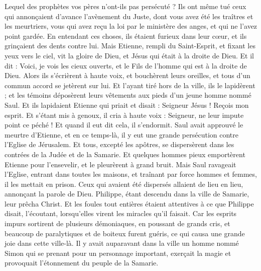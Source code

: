 \begin{multicols}{2}
Lequel des prophètes vos pères n'ont-ils pas persécuté ? Ils ont même tué ceux qui annonçaient d’avance l'avènement du Juste, dont vous avez été les traîtres et les meurtriers,
vous qui avez reçu la loi par le ministère des anges, et qui ne l'avez point gardée.
En entendant ces choses, ils étaient furieux dans leur cœur, et ils grinçaient des dents contre lui.
Mais Etienne, rempli du Saint-Esprit, et fixant les yeux vers le ciel, vit la gloire de Dieu, et Jésus qui était à la droite de Dieu.
Et il dit : Voici, je vois les cieux ouverts, et le Fils de l'homme qui est à la droite de Dieu.
Alors ils s'écrièrent à haute voix, et bouchèrent leurs oreilles, et tous d'un commun accord se jetèrent sur lui.
Et l'ayant tiré hors de la ville, ils le lapidèrent ; et les témoins déposèrent leurs vêtements aux pieds d'un jeune homme nommé Saul.
Et ils lapidaient Etienne qui priait et disait : Seigneur Jésus ! Reçois mon esprit.
Et s'étant mis à genoux, il cria à haute voix : Seigneur, ne leur impute point ce péché ! Et quand il eut dit cela, il s'endormit.
\VerseOne{}Saul avait approuvé le meurtre d'Etienne, et en ce temps-là, il y eut une grande persécution contre l'Eglise de Jérusalem. Et tous, excepté les apôtres, se dispersèrent dans les contrées de la Judée et de la Samarie.
Et quelques hommes pieux emportèrent Etienne pour l'ensevelir, et le pleurèrent à grand bruit.
Mais Saul ravageait l'Eglise, entrant dans toutes les maisons, et traînant par force hommes et femmes, il les mettait en prison.
Ceux qui avaient été dispersés allaient de lieu en lieu, annonçant la parole de Dieu.
Philippe, étant descendu dans la ville de Samarie, leur prêcha Christ.
Et les foules tout entières étaient attentives à ce que Philippe disait, l'écoutant, lorsqu’elles virent les miracles qu'il faisait.
Car les esprits impurs sortirent de plusieurs démoniaques, en poussant de grands cris, et beaucoup de paralytiques et de boiteux furent guéris,
ce qui causa une grande joie dans cette ville-là.
Il y avait auparavant dans la ville un homme nommé Simon qui se prenant pour un personnage important, exerçait la magie et provoquait l’étonnement du peuple de la Samarie.

\end{multicols}
